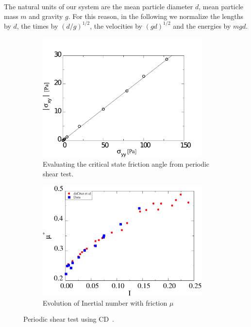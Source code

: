 The natural units of our system are the mean particle diameter $d$, 
mean particle mass $m$ and gravity $g$. For this reason, 
in the following we normalize the lengths by $d$, the times by $(d/g)^{1/2}$, 
the velocities by $(gd)^{1/2}$ and the energies by $mgd$.

\begin{figure}[tbph]
\centering
\begin{subfigure}[t]{0.475\textwidth}
\includegraphics[width=0.95\textwidth]{Sxy_vs_Syy_Slope}
\caption{Evaluating the critical state friction angle from periodic shear 
test.}
\label{fig:Sxy_vs_Syy_Slope}
\end{subfigure}
%
\begin{subfigure}[t]{0.475\textwidth}
\includegraphics[width=0.95\textwidth]{mu_vs_I}
\caption{Evolution of Inertial number with friction $\mu$}
\label{fig:mu_vs_I}
\end{subfigure}
\caption{Periodic shear test using CD~\citep{Mutabaruka2013}.}
\label{fig:Shear_Test_Slope}
\end{figure}

